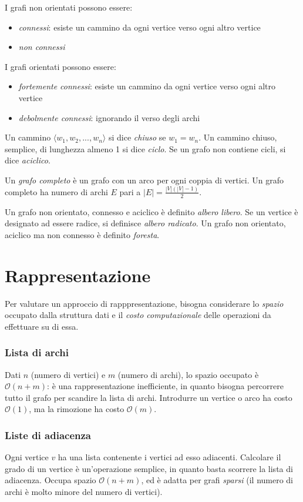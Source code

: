 \documentclass[11pt]{book}
\begin{document}
I grafi non orientati possono essere:
\begin{itemize}
    \item \textit{connessi}: esiste un cammino da ogni vertice verso ogni altro vertice
    \item \textit{non connessi}
\end{itemize}
I grafi orientati possono essere:
\begin{itemize}
    \item \textit{fortemente connessi}: esiste un cammino da ogni vertice verso ogni altro vertice
    \item \textit{debolmente connessi}: ignorando il verso degli archi
\end{itemize}
Un cammino $\langle w_1,w_2,...,w_n \rangle$ si dice \textit{chiuso} se $w_1=w_n$. Un cammino chiuso, semplice, di lunghezza 
almeno 1 si dice \textit{ciclo}. Se un grafo non contiene cicli, si dice \textit{aciclico}.

Un \textit{grafo completo} è un grafo con un arco per ogni coppia di vertici. Un grafo completo ha numero di archi $E$ pari 
a $|E| = \frac{|V|(|V|-1)}{2}$.

Un grafo non orientato, connesso e aciclico è definito \textit{albero libero}. Se un vertice è designato ad essere radice, 
si definisce \textit{albero radicato}. Un grafo non orientato, aciclico ma non connesso è definito \textit{foresta}.
\section{Rappresentazione}
Per valutare un approccio di rapppresentazione, bisogna considerare lo \textit{spazio} occupato dalla struttura dati e il 
\textit{costo computazionale} delle operazioni da effettuare su di essa.
\subsubsection{Lista di archi}
Dati $n$ (numero di vertici) e $m$ (numero di archi), lo spazio occupato è $\mathcal{O}(n+m)$: è una rappresentazione 
inefficiente, in quanto bisogna percorrere tutto il grafo per scandire la lista di archi. Introdurre un vertice o arco ha 
costo $\mathcal{O}(1)$, ma la rimozione ha costo $\mathcal{O}(m)$.
\subsubsection{Liste di adiacenza}
Ogni vertice $v$ ha una lista contenente i vertici ad esso adiacenti. Calcolare il grado di un vertice è un'operazione 
semplice, in quanto basta scorrere la lista di adiacenza. Occupa spazio $\mathcal{O}(n+m)$, ed è adatta per grafi \textit{sparsi} 
(il numero di archi è molto minore del numero di vertici).
\end{document}
